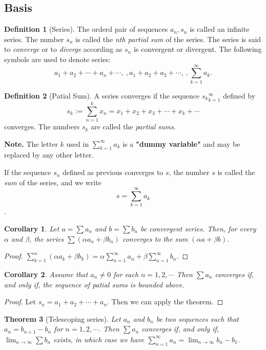 \documentclass{article}
\newtheorem{theorem}{Theorem}[section]
\newtheorem{corollary}[theorem]{Corollary}
\theoremstyle{definition}
\newtheorem{defi}{Definition}[section]
\begin{document}
\subsection{Basis}

\begin{defi}[Series]
The orderd pair of sequences ${a_{n}},{s_{n}}$ is 
called an infinite series. The number $s_{n}$ is called 
the \textit{nth partial sum} of the series. The series is said 
to \textit{converge} or to \textit{diverge} according 
as ${s_{n}}$ is convergent or divergent. The following 
symbols are used to denote series:
$$a_{1}+a_{2}+\cdots +a_{n}+\cdots,\ ,a_{1}+a_{2}+a_{3}+\cdots,\ ,\sum_{k=1}^{\infty}a_{k}.$$
\end{defi}

\begin{defi}[Patial Sum]
A series converges if the sequence ${s_{k}}_{k=1}^{\infty}$ defined by 
$$s_{k}:=\sum_{n=1}^{k}x_{n}=x_{1}+x_{2}+x_{3}+\cdots +x_{k}+\cdots$$
converges. The numbers $s_{k}$ are called the \textit{partial sums}.
\end{defi}

\textbf{Note.} The letter $k$ used in $\sum_{k=1}^{\infty}a_{k}$ 
is a \textbf{"dummy variable"} and may be replaced by 
any other letter.

If the sequence ${s_{n}}$ defined as previous converges to $s$, the 
number $s$ is called the \textit{sum} of the series, and we write
$$ s=\sum_{k=1}^{\infty}a_{k}$$.

\begin{corollary}
    Let $a=\sum a_{n}$ and $b=\sum b_{n}$ be convergent 
    series. Then, for every $\alpha$ and $\beta$, the series $\sum (\alpha a_{n}+\beta b_{n})$
    converges to the sum $(\alpha a+\beta b)$.
\end{corollary}
\begin{proof}
    $\sum_{k=1}^{n} (\alpha a_{k}+\beta b_{k})=\alpha \sum_{n=1}^{\infty}a_{n}+\beta \sum_{n=1}^{\infty}b_{n}.$
\end{proof}

\begin{corollary}
    Assume that $a_{n}\neq 0$ for each $n=1,2,\cdots$ Then $\sum a_{n}$
    converges if, and only if, the sequence of patial sums is bounded above.
\end{corollary}
\begin{proof}
    Let $s_{n}=a_{1}+a_{2}+\cdots+a_{n}$. Then we can apply the theorem.
\end{proof}

\begin{theorem}[Telescoping series]
    Let ${a_{n}}$ and ${b_{n}}$ be two sequences 
    such that $a_{n}=b_{n+1}-b_{n}$ for $n=1,2,\cdots$.
    Then $\sum a_{n}$ converges if, and only if, 
    $\lim_{n\rightarrow \infty}\sum b_{n}$ exists, in which 
    case we have $\sum_{n=1}^{\infty} a_{n}=\lim_{n\rightarrow \infty}b_{n}-b_{1}$.
\end{theorem}
\end{document}
